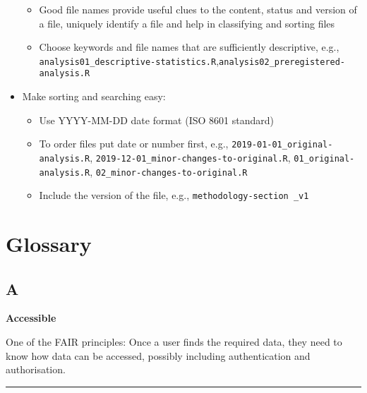\documentclass[
  letterpaper,
  DIV=11,
  numbers=noendperiod]{scrreprt}
\begin{document}
\begin{itemize}
  \begin{itemize}
  \item
    Good file names provide useful clues to the content, status and
    version of a file, uniquely identify a file and help in classifying
    and sorting files
  \item
    Choose keywords and file names that are sufficiently descriptive,
    e.g.,
    \texttt{analysis01\_descriptive-statistics.R},\texttt{analysis02\_preregistered-analysis.R}
  \end{itemize}
\item
  Make sorting and searching easy:

  \begin{itemize}
  \item
    Use YYYY-MM-DD date format (ISO 8601 standard)
  \item
    To order files put date or number first, e.g.,
    \texttt{2019-01-01\_original-analysis.R},
    \texttt{2019-12-01\_minor-changes-to-original.R},
    \texttt{01\_original-analysis.R},
    \texttt{02\_minor-changes-to-original.R}
  \item
    Include the version of the file, e.g.,
    \texttt{methodology-section\ \_v1}
  \end{itemize}
\end{itemize}


\hypertarget{glossary}{%
\chapter*{Glossary}\label{glossary}}


\hypertarget{sec-a}{%
\section*{A}\label{sec-a}}


\textbf{Accessible}

One of the FAIR principles: Once a user finds the required data, they
need to know how data can be accessed, possibly including authentication
and authorisation.

\begin{center}\rule{0.5\linewidth}{0.5pt}\end{center}
\end{document}
